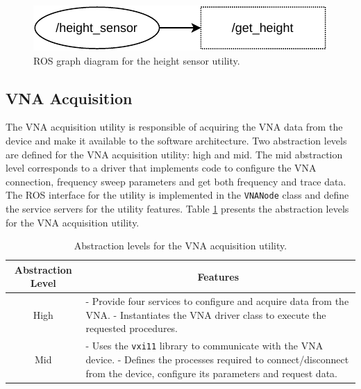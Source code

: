 \documentclass{article}
\begin{document}
\begin{figure}[H]
    \centering
    \includegraphics{images/ROS/height_sensor/ros_height_sensor.pdf}
    \caption{ROS graph diagram for the height sensor utility.}
    \label{fig:height_graph}
\end{figure}

\subsection{VNA Acquisition}
The VNA acquisition utility is responsible of acquiring the VNA data from the device and make it available to the software architecture. Two abstraction levels are defined for the VNA acquisition utility: high and mid. The mid abstraction level corresponds to a driver that implements code to configure the VNA connection, frequency sweep parameters and get both frequency and trace data. The ROS interface for the utility is implemented in the \texttt{VNANode} class and define the service servers for the utility features. Table \ref{tab:acquisition_abstraction} presents the abstraction levels for the VNA acquisition utility.

\begin{table}[H]
    \centering
    \begin{tabular}{|c|p{10cm}|}
        \hline
        \textbf{Abstraction Level} & \multicolumn{1}{c|}{\textbf{Features}} \\ \hline
        High & - Provide four services to configure and acquire data from the VNA. \newline - Instantiates the VNA driver class to execute the requested procedures. \\ \hline
        Mid & - Uses the \texttt{vxi11} library to communicate with the VNA device. \newline - Defines the processes required to connect/disconnect from the device, configure its parameters and request data. \\ \hline
    \end{tabular}
    \caption{Abstraction levels for the VNA acquisition utility.}
    \label{tab:acquisition_abstraction}
\end{table}
\end{document}
